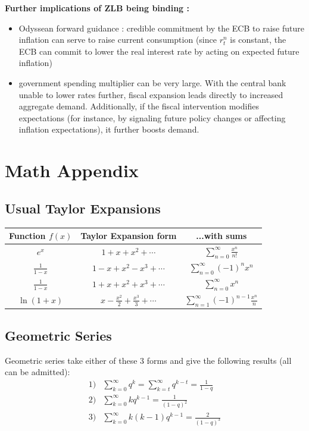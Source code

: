 \documentclass{article}
\begin{document}
 {\small  
 \textbf{Further implications of ZLB being binding :} {\scriptsize 
        \begin{itemize}
            \item Odyssean forward guidance : credible commitment by the ECB to raise future inflation can serve to raise current consumption (since $r_t^n$ is constant, the ECB can commit to lower the real interest rate by acting on expected future inflation)
            \item government spending multiplier can be very large. With the central bank unable to lower rates further, fiscal expansion leads directly to increased aggregate demand. Additionally, if the fiscal intervention modifies expectations (for instance, by signaling future policy changes or affecting inflation expectations), it further boosts demand.
    \end{itemize}}

\section{Math Appendix}
\subsection{Usual Taylor Expansions}
\begin{tabular}{c|c|c}
\toprule
Function $f(x)$ & Taylor Expansion form & ...with sums \\ 
\midrule 
$e^x$ & $1 + x + x^2 + \cdots$ & $\sum_{n=0}^\infty\frac{x^n}{n!}$ \\ 
\midrule
$\frac{1}{1-x}$ & $1 - x + x^2 - x^3 + \cdots$ & $\sum_{n=0}^\infty (-1)^nx^n$ \\ 
\midrule
$\frac{1}{1-x}$ & $1 + x + x^2 + x^3 + \cdots$ & $\sum_{n=0}^\infty x^n$ \\ 
\midrule
$\ln(1+x)$ & $x - \frac{x^2}{2} + \frac{x^3}{3} + \cdots$ & $\sum_{n=1}^\infty(-1)^{n-1}\frac{x^n}{n}$ \\ 
\bottomrule
\end{tabular}
\subsection{Geometric Series}
Geometric series take either of these 3 forms and give the following results (all can be admitted): 
\begin{equation}
\begin{aligned}
    1)& \sum_{k=0}^\infty q^k = \sum_{k=t}^\infty q^{k-t} = \frac{1}{1-q} \\
    2)& \sum_{k=0}^\infty kq^{k-1} = \frac{1}{(1-q)^2} \\
    3)& \sum_{k=0}^\infty k(k-1)q^{k-1} = \frac{2}{(1-q)^3}
\end{aligned}
\end{equation}
}
\end{document}
